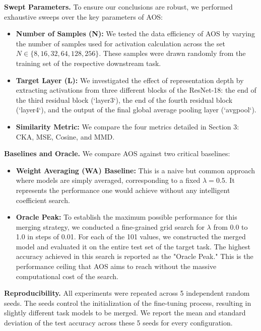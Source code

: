 \documentclass{article}
\theoremstyle{plain}
\theoremstyle{definition}
\theoremstyle{remark}
\begin{document}
\textbf{Swept Parameters.} To ensure our conclusions are robust, we performed exhaustive sweeps over the key parameters of AOS:
\begin{itemize}
    \item \textbf{Number of Samples (N):} We tested the data efficiency of AOS by varying the number of samples used for activation calculation across the set $N \in \{8, 16, 32, 64, 128, 256\}$. These samples were drawn randomly from the training set of the respective downstream task.
    \item \textbf{Target Layer (L):} We investigated the effect of representation depth by extracting activations from three different blocks of the ResNet-18: the end of the third residual block (`layer3`), the end of the fourth residual block (`layer4`), and the output of the final global average pooling layer (`avgpool`).
    \item \textbf{Similarity Metric:} We compare the four metrics detailed in Section 3: CKA, MSE, Cosine, and MMD.
\end{itemize}

\textbf{Baselines and Oracle.} We compare AOS against two critical baselines:
\begin{itemize}
    \item \textbf{Weight Averaging (WA) Baseline:} This is a naive but common approach where models are simply averaged, corresponding to a fixed $\lambda=0.5$. It represents the performance one would achieve without any intelligent coefficient search.
    \item \textbf{Oracle Peak:} To establish the maximum possible performance for this merging strategy, we conducted a fine-grained grid search for $\lambda$ from 0.0 to 1.0 in steps of 0.01. For each of the 101 values, we constructed the merged model and evaluated it on the entire test set of the target task. The highest accuracy achieved in this search is reported as the "Oracle Peak." This is the performance ceiling that AOS aims to reach without the massive computational cost of the search.
\end{itemize}

\textbf{Reproducibility.} All experiments were repeated across 5 independent random seeds. The seeds control the initialization of the fine-tuning process, resulting in slightly different task models to be merged. We report the mean and standard deviation of the test accuracy across these 5 seeds for every configuration.
\end{document}
